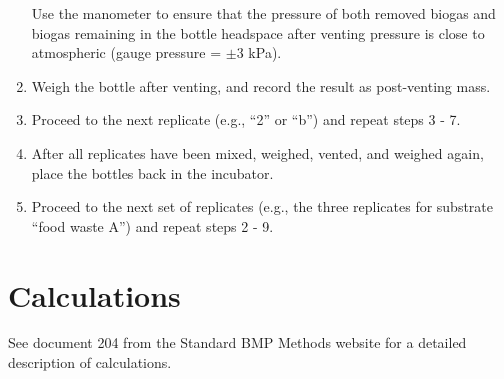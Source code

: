 \documentclass[]{article}
\begin{document}
\begin{enumerate}
      Use the manometer to ensure that the pressure of both removed biogas and biogas remaining in the bottle headspace after venting pressure is close to atmospheric (gauge pressure = $\pm3$ kPa).
    \item Weigh the bottle after venting, and record the result as post-venting mass. 
    \item Proceed to the next replicate (e.g., ``2'' or ``b'') and repeat steps 3 - 7.
    \item After all replicates have been mixed, weighed, vented, and weighed again, place the bottles back in the incubator.
    \item Proceed to the next set of replicates (e.g., the three replicates for substrate ``food waste A'') and repeat steps 2 - 9.
\end{enumerate}

\section{Calculations}
See document 204 from the Standard BMP Methods website \citep{BMPdoc204gasdens} for a detailed description of calculations. 



\end{document}
